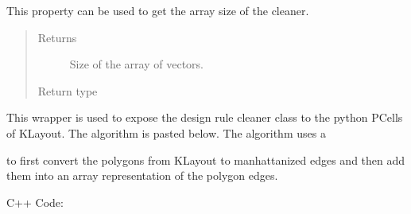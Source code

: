 \documentclass[a4paper,10pt,english]{sphinxmanual}
\begin{document}
\begin{fulllineitems}

\begin{fulllineitems}
\label{\detokenize{drc:kppc.drc.kppc.drc.slcleaner.PyDrcSl.s}}
This property can be used to get the array size of the cleaner.
\begin{quote}\begin{description}
\item[{Returns}] \leavevmode
Size of the array of vectors.

\item[{Return type}] \leavevmode
{}%
\begin{footnote}[10]\sphinxAtStartFootnote
{}
%
\end{footnote}

\end{description}\end{quote}

\end{fulllineitems}


\end{fulllineitems}


This wrapper is used to expose the design rule cleaner class to the python PCells of KLayout.
The algorithm is pasted below. The algorithm uses a %
\begin{footnote}[11]\sphinxAtStartFootnote
{}
%
\end{footnote}
to first convert the polygons from KLayout to manhattanized edges and then add them into an array representation
of the polygon edges.

C++ Code:
\end{document}
